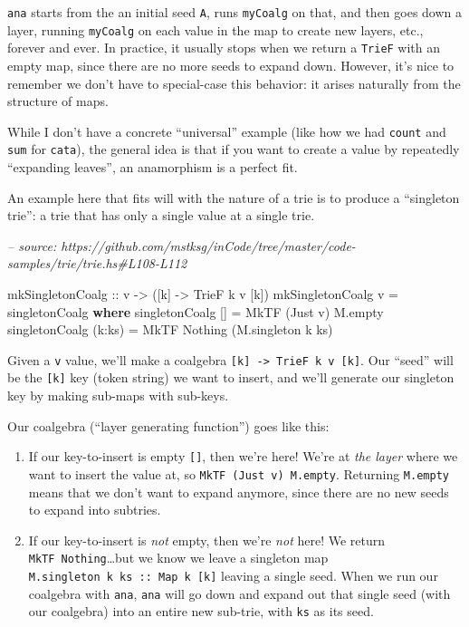 \documentclass[]{article}
\newenvironment{Shaded}{}{}
\newcommand{\CommentTok}[1]{\textcolor[rgb]{0.38,0.63,0.69}{\textit{#1}}}
\newcommand{\DataTypeTok}[1]{\textcolor[rgb]{0.56,0.13,0.00}{#1}}
\newcommand{\FunctionTok}[1]{\textcolor[rgb]{0.02,0.16,0.49}{#1}}
\newcommand{\KeywordTok}[1]{\textcolor[rgb]{0.00,0.44,0.13}{\textbf{#1}}}
\newcommand{\NormalTok}[1]{#1}
\newcommand{\OtherTok}[1]{\textcolor[rgb]{0.00,0.44,0.13}{#1}}
\begin{document}
\texttt{ana} starts from the an initial seed \texttt{A}, runs \texttt{myCoalg}
on that, and then goes down a layer, running \texttt{myCoalg} on each value in
the map to create new layers, etc., forever and ever. In practice, it usually
stops when we return a \texttt{TrieF} with an empty map, since there are no more
seeds to expand down. However, it's nice to remember we don't have to
special-case this behavior: it arises naturally from the structure of maps.

While I don't have a concrete ``universal'' example (like how we had
\texttt{count} and \texttt{sum} for \texttt{cata}), the general idea is that if
you want to create a value by repeatedly ``expanding leaves'', an anamorphism is
a perfect fit.

An example here that fits will with the nature of a trie is to produce a
``singleton trie'': a trie that has only a single value at a single trie.

\begin{Shaded}
\begin{Highlighting}[]
\CommentTok{-- source: https://github.com/mstksg/inCode/tree/master/code-samples/trie/trie.hs#L108-L112}

\OtherTok{mkSingletonCoalg ::}\NormalTok{ v }\OtherTok{->}\NormalTok{ ([k] }\OtherTok{->} \DataTypeTok{TrieF}\NormalTok{ k v [k])}
\NormalTok{mkSingletonCoalg v }\FunctionTok{=}\NormalTok{ singletonCoalg}
  \KeywordTok{where}
\NormalTok{    singletonCoalg []     }\FunctionTok{=} \DataTypeTok{MkTF}\NormalTok{ (}\DataTypeTok{Just}\NormalTok{ v) M.empty}
\NormalTok{    singletonCoalg (k}\FunctionTok{:}\NormalTok{ks) }\FunctionTok{=} \DataTypeTok{MkTF} \DataTypeTok{Nothing}\NormalTok{  (M.singleton k ks)}
\end{Highlighting}
\end{Shaded}

Given a \texttt{v} value, we'll make a coalgebra
\texttt{{[}k{]}\ -\textgreater{}\ TrieF\ k\ v\ {[}k{]}}. Our ``seed'' will be
the \texttt{{[}k{]}} key (token string) we want to insert, and we'll generate
our singleton key by making sub-maps with sub-keys.

Our coalgebra (``layer generating function'') goes like this:

\begin{enumerate}
\def\labelenumi{\arabic{enumi}.}
\item
  If our key-to-insert is empty \texttt{{[}{]}}, then we're here! We're at
  \emph{the layer} where we want to insert the value at, so
  \texttt{MkTF\ (Just\ v)\ M.empty}. Returning \texttt{M.empty} means that we
  don't want to expand anymore, since there are no new seeds to expand into
  subtries.
\item
  If our key-to-insert is \emph{not} empty, then we're \emph{not} here! We
  return \texttt{MkTF\ Nothing}\ldots{}but we know we leave a singleton map
  \texttt{M.singleton\ k\ ks\ ::\ Map\ k\ {[}k{]}} leaving a single seed. When
  we run our coalgebra with \texttt{ana}, \texttt{ana} will go down and expand
  out that single seed (with our coalgebra) into an entire new sub-trie, with
  \texttt{ks} as its seed.
\end{enumerate}
\end{document}
